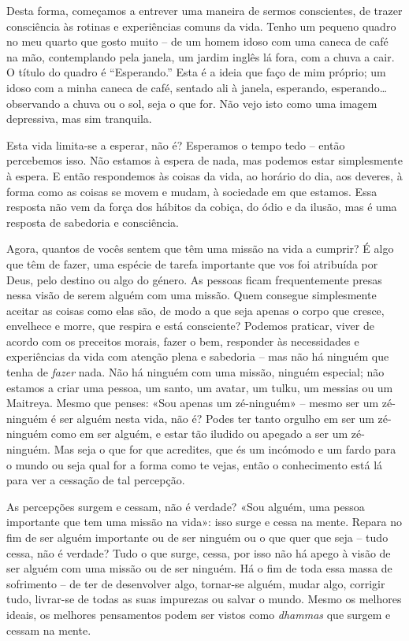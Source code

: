 Desta forma, começamos a entrever uma maneira de sermos conscientes, de trazer
consciência às rotinas e experiências comuns da vida. Tenho um pequeno quadro no
meu quarto que gosto muito -- de um homem idoso com uma caneca de café na mão,
contemplando pela janela, um jardim inglês lá fora, com a chuva a cair. O título
do quadro é ``Esperando.'' Esta é a ideia que faço de mim próprio; um idoso com
a minha caneca de café, sentado ali à janela, esperando, esperando\ldots{}
observando a chuva ou o sol, seja o que for. Não vejo isto como uma imagem
depressiva, mas sim tranquila.

Esta vida limita-se a esperar, não é? Esperamos o tempo tedo -- então
percebemos isso. Não estamos à espera de nada, mas podemos estar simplesmente à
espera. E então respondemos às coisas da vida, ao horário do dia, aos deveres, à
forma como as coisas se movem e mudam, à sociedade em que estamos. Essa resposta
não vem da força dos hábitos da cobiça, do ódio e da ilusão, mas é uma resposta
de sabedoria e consciência.

Agora, quantos de vocês sentem que têm uma missão na vida a cumprir? É algo que
têm de fazer, uma espécie de tarefa importante que vos foi atribuída por Deus,
pelo destino ou algo do género. As pessoas ficam frequentemente presas nessa
visão de serem alguém com uma missão. Quem consegue simplesmente aceitar as
coisas como elas são, de modo a que seja apenas o corpo que cresce, envelhece e
morre, que respira e está consciente? Podemos praticar, viver de acordo com os
preceitos morais, fazer o bem, responder às necessidades e experiências da vida
com atenção plena e sabedoria -- mas não há ninguém que tenha de \emph{fazer}
nada. Não há ninguém com uma missão, ninguém especial; não estamos a criar uma
pessoa, um santo, um avatar, um tulku, um messias ou um Maitreya. Mesmo que
penses: «Sou apenas um zé-ninguém» -- mesmo ser um zé-ninguém é ser alguém
nesta vida, não é? Podes ter tanto orgulho em ser um zé-ninguém como em ser
alguém, e estar tão iludido ou apegado a ser um zé-ninguém. Mas seja o que for
que acredites, que és um incómodo e um fardo para o mundo ou seja qual for a
forma como te vejas, então o conhecimento está lá para ver a cessação de tal
percepção.

As percepções surgem e cessam, não é verdade? «Sou alguém, uma pessoa importante
que tem uma missão na vida»: isso surge e cessa na mente. Repara no fim de ser
alguém importante ou de ser ninguém ou o que quer que seja -- tudo cessa, não é
verdade? Tudo o que surge, cessa, por isso não há apego à visão de ser alguém
com uma missão ou de ser ninguém. Há o fim de toda essa massa de sofrimento --
de ter de desenvolver algo, tornar-se alguém, mudar algo, corrigir tudo,
livrar-se de todas as suas impurezas ou salvar o mundo. Mesmo os melhores
ideais, os melhores pensamentos podem ser vistos como \emph{dhammas} que surgem
e cessam na mente.

